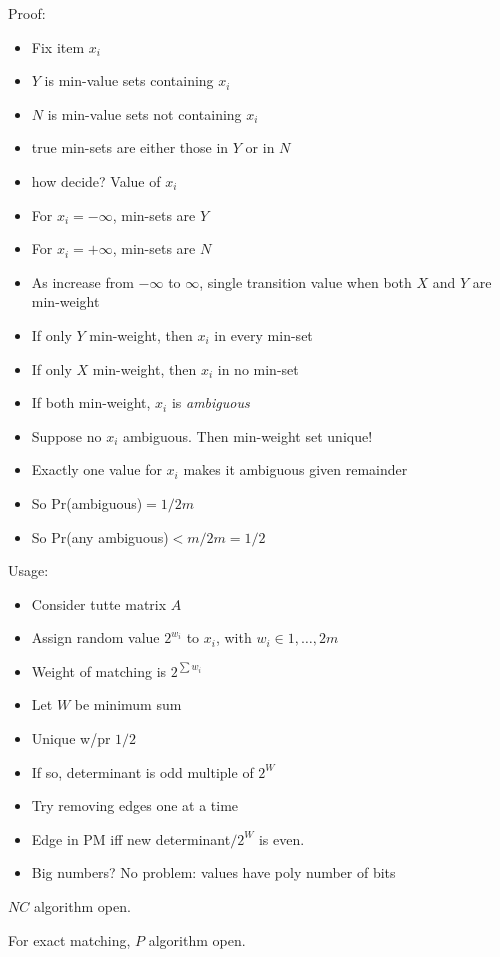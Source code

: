 \documentclass[12pt]{article}
\begin{document}
Proof:
\begin{itemize}
\item Fix item $x_i$
\item $Y$ is min-value sets containing $x_i$
\item $N$ is min-value sets not containing $x_i$
\item true min-sets are either those in $Y$ or in $N$
\item how decide? Value of $x_i$
\item For $x_i=-\infty$, min-sets are $Y$
\item For $x_i=+\infty$, min-sets are $N$
\item As increase from $-\infty$ to $\infty$, single transition value
  when both $X$ and $Y$ are min-weight
\item If only $Y$ min-weight, then $x_i$ in every min-set
\item If only $X$ min-weight, then $x_i$ in no min-set
\item If both min-weight, $x_i$ is \emph{ambiguous}
\item Suppose no $x_i$ ambiguous.  Then min-weight set unique!
\item Exactly one value for $x_i$ makes it ambiguous given remainder
\item So Pr(ambiguous)$=1/2m$
\item So Pr(any ambiguous)$< m/2m=1/2$
\end{itemize}

Usage:
\begin{itemize}
\item Consider tutte matrix $A$
\item Assign random value $2^{w_i}$ to $x_i$, with $w_i \in
  1,\ldots,2m$
\item Weight of matching is $2^{\sum w_i}$
\item Let $W$ be minimum sum
\item Unique w/pr $1/2$
\item If so, determinant is odd multiple of $2^W$
\item Try removing edges one at a time
\item Edge in PM iff new determinant$/2^W$ is even.
\item Big numbers?  No problem: values have poly number of bits
\end{itemize}

$NC$ algorithm open.

For exact matching, $P$ algorithm open.

\newcommand{\Wbar}{\overline W}
\end{document}
